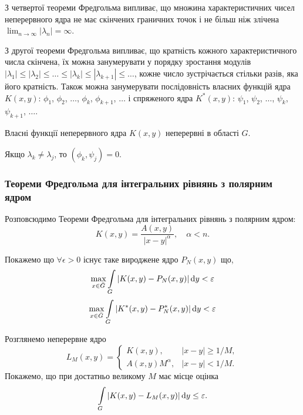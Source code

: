 \begin{corollary}
	З четвертої теореми Фредгольма випливає, що множина характеристичних чисел неперервного ядра не має скінчених граничних точок і не більш ніж злічена $\lim_{n \to \infty} |\lambda_n| = \infty$.
\end{corollary}
\begin{corollary}
	З другої теореми Фредгольма випливає, що кратність кожного характеристичного числа скінчена, їх можна занумерувати у порядку зростання модулів $|\lambda_1| \le |\lambda_2| \le \ldots \le |\lambda_k| \le |\lambda_{k + 1}| \le \ldots$, кожне число зустрічається стільки разів, яка його кратність. Також можна занумерувати послідовність власних функцій ядра $K(x, y)$: $\phi_1$, $\phi_2$, $\ldots$, $\phi_k$, $\phi_{k + 1}$, $\ldots$ і спряженого ядра $K^*(x, y)$: $\psi_1$, $\psi_2$, $\ldots$, $\psi_k$, $\psi_{k + 1}$, $\ldots$.
\end{corollary}
\begin{corollary}
	Власні функції неперервного ядра $K(x, y)$ неперервні в області $G$.
\end{corollary}
\begin{corollary}
	Якщо $\lambda_k \ne \lambda_j$, то $(\phi_k, \psi_j) = 0$.
\end{corollary}

\subsubsection*{Теореми Фредгольма для інтегральних рівнянь з полярним ядром}


Розповсюдимо Теореми Фредгольма для інтегральних рівнянь з полярним ядром:
\begin{equation}
	\label{eq:2.21}
	K(x, y) = \dfrac{A(x, y)}{|x - y|^\alpha}, \quad \alpha < n.
\end{equation}

Покажемо що $\forall \epsilon > 0$ існує таке вироджене ядро $P_N(x, y)$ що,
\begin{equation}
	\label{eq:2.22}
	\displaystyle\max\limits_{x \in \bar G} \displaystyle\int\limits_G |K(x, y) - P_N(x, y)| \mathop{}\!\mathrm{d} y < \varepsilon
\end{equation}
\begin{equation}
	\label{eq:2.22'}
	\displaystyle\max\limits_{x \in \bar G} \displaystyle\int\limits_G |K^*(x, y) - P_N^*(x, y)| \mathop{}\!\mathrm{d} y < \varepsilon
\end{equation}

Розглянемо неперервне ядро
\begin{equation}
	\label{eq:2.23}
	L_M(x, y) = \begin{cases}
		K(x, y), & |x - y| \ge 1 / M, \\
		A(x, y) M^\alpha, & |x - y| < 1 / M.
	\end{cases}
\end{equation}
Покажемо, що при достатньо великому $M$ має місце оцінка \[ \displaystyle\int\limits_G |K(x, y) - L_M(x, y)| \mathop{}\!\mathrm{d} y \le \varepsilon. \]

